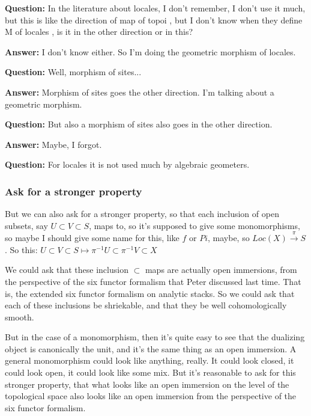 \textbf{Question:} In the literature about locales, I don't remember, I don't use it much, but this is like the direction of map of topoi \citeme{}, but I don't know when they define M of locales , is it in the other direction or in this? 

\textbf{Answer:} I don't know either. So I'm doing the geometric morphism of locales. 

\textbf{Question:} Well, morphism of sites...

\textbf{Answer:} Morphism of sites goes the other direction. I'm talking about a geometric morphism. 

\textbf{Question:} But also a morphism of sites  also goes in the other direction.

\textbf{Answer:} Maybe, I forgot.

\textbf{Question:} For locales it is not used much by algebraic geometers.

\subsubsection{Ask for a stronger property} \label{subsubsec:ask_for_a_stronger_property}
But we can also ask for a stronger property, so that each inclusion of open subsets, say $ U \subset V \subset S$, maps to, so it's supposed to give some monomorphisms, so maybe I should give some name for this, like $f$ or $Pi$, maybe, so $Loc(X) \xrightarrow{\pi} S$. So this: $

U \subset V \subset S \mapsto \pi^{-1} U \subset \pi^{-1} V \subset X

$

We could ask that these inclusion $\subset$ maps are actually open immersions, from the perspective of the six functor formalism that Peter discussed last time. That is, the extended six functor formalism on analytic stacks. So we could ask that each of these inclusions be shriekable, and that they be well cohomologically smooth.

But in the case of a monomorphism, then it's quite easy to see that the dualizing object is canonically the unit, and it's the same thing as an open immersion. 
A general monomorphism could look like anything, really. It could look closed, it could look open, it could look like some mix. But it's reasonable to ask for this stronger property, that what looks like an open immersion on the level of the topological space also looks like an open immersion from the perspective of the six functor formalism.

